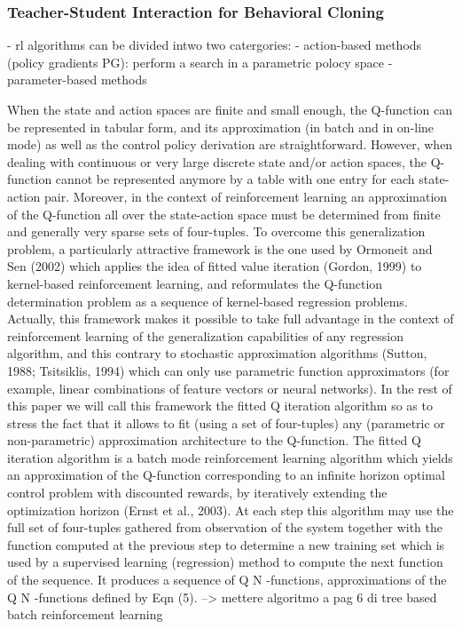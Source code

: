 \subsubsection{Teacher-Student Interaction for Behavioral Cloning}
\label{teacher-student}

\cite{il}





- rl algorithms can be divided intwo two catergories: 
	- action-based methods (policy gradients PG):
		perform a search in a parametric polocy space 
	- parameter-based methods







	When the state and action spaces are finite and small enough, the Q-function can be represented in tabular form, and its approximation (in batch and in on-line mode) as well as the control policy derivation are straightforward. However, when dealing with continuous or very large discrete state and/or action spaces, the Q-function cannot be represented anymore by a table with one entry for each state-action pair. Moreover, in the context of reinforcement learning an approximation of the Q-function all over the state-action space must be determined from finite and generally very sparse sets of four-tuples.
To overcome this generalization problem, a particularly attractive framework is the one used by Ormoneit and Sen (2002) which applies the idea of fitted value iteration (Gordon, 1999) to kernel-based reinforcement learning, and reformulates the Q-function determination problem as a sequence of kernel-based regression problems. Actually, this framework makes it possible to take full advantage in the context of reinforcement learning of the generalization capabilities of any regression algorithm, and this contrary to stochastic approximation algorithms (Sutton, 1988; Tsitsiklis, 1994) which can only use parametric function approximators (for example, linear combinations of feature vectors or neural networks). In the rest of this paper we will call this framework the fitted Q iteration
algorithm so as to stress the fact that it allows to fit (using a set of four-tuples) any (parametric or non-parametric) approximation architecture to the Q-function.
The fitted Q iteration algorithm is a batch mode reinforcement learning algorithm which yields an approximation of the Q-function corresponding to an infinite horizon optimal control problem with discounted rewards, by iteratively extending the optimization horizon (Ernst et al., 2003).
At each step this algorithm may use the full set of four-tuples gathered from observation of the system together with the function computed at the previous step to determine a new training set which is used by a supervised learning (regression) method to compute the next function of the sequence. It produces a sequence of Q N -functions, approximations of the Q N -functions defined by Eqn (5). --> mettere algoritmo a pag 6 di tree based batch reinforcement learning

